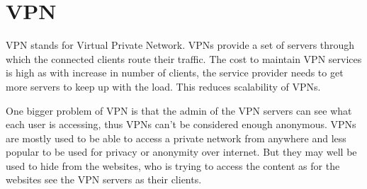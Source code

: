 \documentclass{main}
\begin{document}
\section{VPN}
VPN stands for Virtual Private Network. VPNs provide a set of servers through which the connected clients
route their traffic. The cost to maintain VPN services is high as with increase in number of clients, the
service provider needs to get more servers to keep up with the load. This reduces scalability of VPNs. 

One bigger problem of VPN is that the admin of the VPN servers can see what each user is accessing, thus 
VPNs can't be considered enough anonymous.
VPNs are mostly used to be able to access a private network from anywhere and less popular to be used
for privacy or anonymity over internet. But they may well be used to hide from the websites, who is trying to
access the content as for the websites see the VPN servers as their clients.
\end{document}
